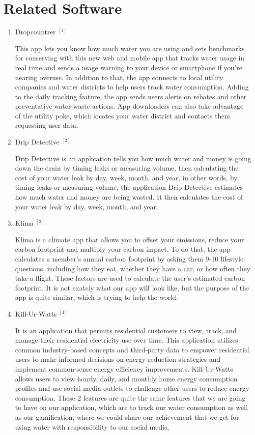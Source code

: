 \documentclass[10pt]{article}
\begin{document}
\section{Related Software}

\begin{enumerate}

  \item {Dropcountrer ${ }^{[1]}$}
  
  This app lets you know how much water you are using and sets benchmarks for conserving with this new web and mobile app that tracks water usage in real time and sends a usage warning to your device or smartphone if you're nearing overuse. In addition to that, the app connects to local utility companies and water districts to help users track water consumption. Adding to the daily tracking feature, the app sends users alerts on rebates and other preventative water-waste actions. App downloaders can also take advantage of the utility poke, which locates your water district and contacts them requesting user data.

  \item {Drip Detective ${ }^{[2]}$}
  
  Drip Detective is an application tells you how much water and money is going down the drain by timing leaks or measuring volume, then calculating the cost of your water leak by day, week, month, and year, in other words, by timing leaks or measuring volume, the application Drip Detective estimates how much water and money are being wasted. It then calculates the cost of your water leak by day, week, month, and year.

  \item {Klima ${ }^{[3]}$}
  
  Klima is a climate app that allows you to offset your emissions, reduce your carbon footprint and multiply your carbon impact. To do that, the app calculates a member's annual carbon footprint by asking them 9-10 lifestyle questions, including how they eat, whether they have a car, or how often they take a flight. These factors are used to calculate the user's estimated carbon footprint. It is not exatcly what our app will look like, but the purpose of the app is quite similar, which is trying to help the world.

  \item {Kill-Ur-Watts ${ }^{[4]}$}
  
  It is an application that permits residential customers to view, track, and manage their residential electricity use over time. This application utilizes common industry-based concepts and third-party data to empower residential users to make informed decisions on energy reduction strategies and implement common-sense energy efficiency improvements. Kill-Ur-Watts allows users to view hourly, daily, and monthly home energy consumption profiles and use social media outlets to challenge other users to reduce energy consumption. These 2 features are quite the same features that we are going to have on our application, which are to track our water consumption as well as our gamification, where we could share our achievement that we get for using water with responsibility to our social media.


\end{enumerate}
\end{document}
